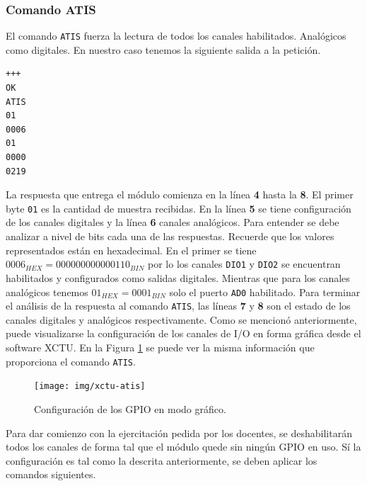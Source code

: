 \documentclass[11pt,oneside,spanish,a4paper]{article}
\begin{document}
\subsubsection{Comando ATIS}
\label{sec:atis}

El comando \texttt{ATIS} fuerza la lectura de todos los canales
habilitados. Analógicos como digitales. En nuestro caso tenemos la
siguiente salida a la petición.

\begin{lstlisting}[emph={+++,ATIS}, emphstyle={\color{blue}}]
+++
OK
ATIS
01
0006
01
0000
0219
\end{lstlisting}

La respuesta que entrega el módulo comienza en la línea \textbf{4}
hasta la \textbf{8}. El primer byte \texttt{01} es la cantidad de
muestra recibidas. En la línea \textbf{5} se tiene configuración de
los canales digitales y la línea \textbf{6} canales analógicos. Para
entender se debe analizar a nivel de bits cada una de las
respuestas. Recuerde que los valores representados están en
hexadecimal. En el primer se tiene $0006_{HEX} =
000000000000110_{BIN}$ por lo los canales \texttt{DIO1} y
\texttt{DIO2} se encuentran habilitados y configurados como salidas
digitales. Mientras que para los canales analógicos tenemos
$01_{HEX} = 0001_{BIN}$ solo el puerto \texttt{AD0} habilitado. Para
terminar el análisis de la respuesta al comando \texttt{ATIS}, las
líneas \textbf{7} y \textbf{8} son el estado de los canales
digitales y analógicos respectivamente. Como se mencionó
anteriormente, puede visualizarse la configuración de los canales de
I/O en forma gráfica desde el software XCTU. En la Figura
\ref{fig:xctu-setup} se puede ver la misma información que
proporciona el comando \texttt{ATIS}.

\begin{figure}[h]
  \centering
  \texttt{[image: img/xctu-atis]}
  \caption{Configuración de los GPIO en modo gráfico.}
  \label{fig:xctu-setup}
\end{figure}

Para dar comienzo con la ejercitación pedida por los docentes, se
deshabilitarán todos los canales de forma tal que el módulo quede sin
ningún GPIO en uso. Sí la configuración es tal como la descrita
anteriormente, se deben aplicar los comandos siguientes.
\end{document}
